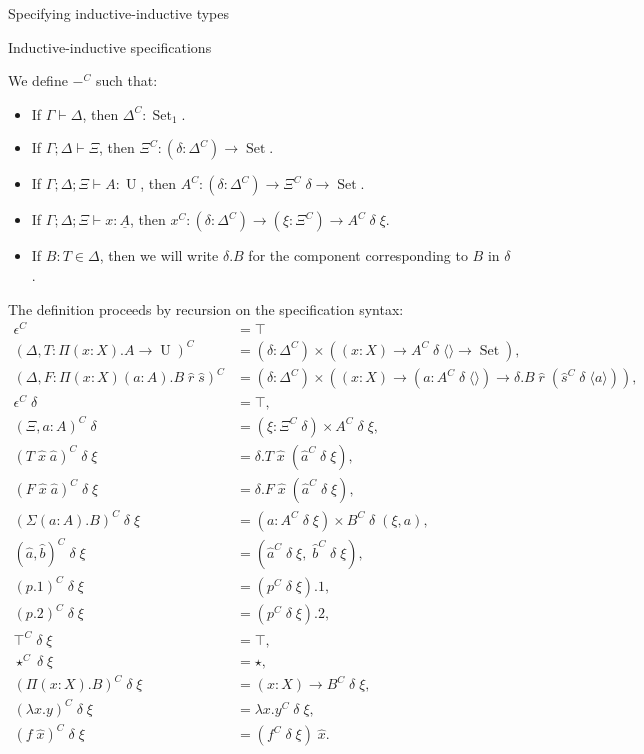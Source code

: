 \documentclass[runningheads]{llncs}
\DeclareMathOperator{\USet}{Set}
\DeclareMathOperator{\UU}{U}
\newcommand{\tac}{\vdash}
\def\emptytuple{\langle\rangle}
\begin{document}
{\begin{section}{Specifying inductive-inductive types}
\begin{subsection}{Inductive-inductive specifications}
\begin{definition}
We define $-^C$ such that:
\begin{itemize}
    \item If $\Gamma \tac \Delta$, then $\Delta^C : \USet_1$.
    \item If $\Gamma ; \Delta \tac \Xi$, then $\Xi^C : (\delta : \Delta^C) \to \USet$.
    \item If $\Gamma ; \Delta ; \Xi \tac A : \UU$, then $A^C : (\delta : \Delta^C) \to \Xi^C\;\delta \to \USet$.
    \item If $\Gamma ; \Delta ; \Xi \tac x : \underline{A}$, then $x^C : (\delta : \Delta^C) \to (\xi : \Xi^C) \to A^C\;\delta\;\xi$.
    \item If $B : T \in \Delta$, then we will write $\delta . B$ for the component corresponding to $B$ in $\delta$. %
\end{itemize}
The definition proceeds by recursion on the specification syntax:
\begin{align*}
\epsilon^C &= \top\\
(\Delta , T : \Pi(x : X).A \to \UU)^C &= (\delta : \Delta^C)\times ((x : X) \to A^C\;\delta\;\emptytuple \to \USet),\\
(\Delta , F : \Pi(x : X)(a : A).B\;\hat{r}\;\hat{s})^C &= (\delta : \Delta^C) \times ((x : X) \to (a : A^C\;\delta\;\emptytuple) \to \delta.B\;\hat{r}\;(\hat{s}^C\;\delta\;\langle a \rangle)),\\
\epsilon^C\;\delta &= \top,\\
(\Xi , a : A)^C\;\delta &= (\xi : \Xi^C\;\delta) \times A^C\;\delta\;\xi,\\
(T\;\hat{x}\;\hat{a})^C\;\delta\;\xi &= \delta.T\;\hat{x}\;(\hat{a}^C\;\delta\;\xi),\\
(F\;\hat{x}\;\hat{a})^C\;\delta\;\xi &= \delta.F\;\hat{x}\;(\hat{a}^C\;\delta\;\xi),\\
(\Sigma(a : A).B)^C\;\delta\;\xi & = (a : A^C\;\delta\;\xi) \times B^C\;\delta\;(\xi , a),\\
(\hat{a} , \hat{b})^C\;\delta\;\xi & = (\hat{a}^C\;\delta\;\xi ,\; \hat{b}^C\;\delta\;\xi),\\
(p.1)^C\;\delta\;\xi &= (p^C\;\delta\;\xi).1,\\
(p.2)^C\;\delta\;\xi &= (p^C\;\delta\;\xi).2,\\
\top^C\;\delta\;\xi &= \top,\\
\star^C\;\delta\;\xi &= \star,\\
(\Pi(x : X).B)^C\;\delta\;\xi &= (x : X) \to B^C\;\delta\;\xi,\\
(\lambda x.y)^C\;\delta\;\xi &= \lambda x. y^C\;\delta\;\xi,\\
(f\;\hat{x})^C\;\delta\;\xi &= (f^C\;\delta\;\xi)\;\hat{x}.
\end{align*}


\end{definition}
\end{subsection}
\end{section}}
\end{document}
